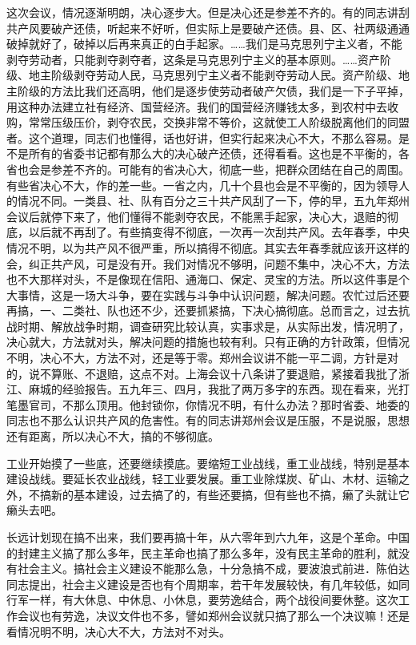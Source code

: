 这次会议，情况逐渐明朗，决心逐步大。但是决心还是参差不齐的。有的同志讲刮共产风要破产还债，听起来不好听，但实际上是要破产还债。县、区、社两级通通破掉就好了，破掉以后再来真正的白手起家。……我们是马克思列宁主义者，不能剥夺劳动者，只能剥夺剥夺者，这条是马克思列宁主义的基本原则。……资产阶级、地主阶级剥夺劳动人民，马克思列宁主义者不能剥夺劳动人民。资产阶级、地主阶级的方法比我们还高明，他们是逐步使劳动者破产欠债，我们是一下子平掉，用这种办法建立社有经济、国营经济。我们的国营经济赚钱太多，到农村中去收购，常常压级压价，剥夺农民，交换非常不等价，这就使工人阶级脱离他们的同盟者。这个道理，同志们也懂得，话也好讲，但实行起来决心不大，不那么容易。是不是所有的省委书记都有那么大的决心破产还债，还得看看。这也是不平衡的，各省也会是参差不齐的。可能有的省决心大，彻底一些，把群众团结在自己的周围。有些省决心不大，作的差一些。一省之内，几十个县也会是不平衡的，因为领导人的情况不同。一类县、社、队有百分之三十共产风刮了一下，停的早，五九年郑州会议后就停下来了，他们懂得不能剥夺农民，不能黑手起家，决心大，退赔的彻底，以后就不再刮了。有些搞变得不彻底，一次再一次刮共产风。去年春季，中央情况不明，以为共产风不很严重，所以搞得不彻底。其实去年春季就应该开这样的会，纠正共产风，可是没有开。我们对情况不够明，问题不集中，决心不大，方法也不大那样对头，不是像现在信阳、通海口、保定、灵宝的方法。所以这件事是个大事情，这是一场大斗争，要在实践与斗争中认识问题，解决问题。农忙过后还要再搞，一、二类社、队也还不少，还要抓紧搞，下决心搞彻底。总而言之，过去抗战时期、解放战争时期，调查研究比较认真，实事求是，从实际出发，情况明了，决心就大，方法就对头，解决问题的措施也较有利。只有正确的方针政策，但情况不明，决心不大，方法不对，还是等于零。郑州会议讲不能一平二调，方针是对的，说不算账、不退赔，这点不对。上海会议十八条讲了要退赔，紧接着我批了浙江、麻城的经验报告。五九年三、四月，我批了两万多字的东西。现在看来，光打笔墨官司，不那么顶用。他封锁你，你情况不明，有什么办法？那时省委、地委的同志也不那么认识共产风的危害性。有的同志讲郑州会议是压服，不是说服，思想还有距离，所以决心不大，搞的不够彻底。

工业开始摸了一些底，还要继续摸底。要缩短工业战线，重工业战线，特别是基本建设战线。要延长农业战线，轻工业要发展。重工业除煤炭、矿山、木材、运输之外，不搞新的基本建设，过去搞了的，有些还要搞，但有些也不搞，癞了头就让它癞头去吧。

长远计划现在搞不出来，我们要再搞十年，从六零年到六九年，这是个革命。中国的封建主义搞了那么多年，民主革命也搞了那么多年，没有民主革命的胜利，就没有社会主义。搞社会主义建设不能那么急，十分急搞不成，要波浪式前进．陈伯达同志提出，社会主义建设是否也有个周期率，若干年发展较快，有几年较低，如同行军一样，有大休息、中休息、小休息，要劳逸结合，两个战役间要休整。这次工作会议也有劳逸，决议文件也不多，譬如郑州会议就只搞了那么一个决议嘛！还是看情况明不明，决心大不大，方法对不对头。

